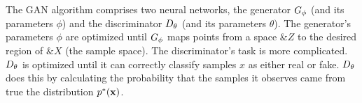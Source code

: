 The GAN algorithm comprises two neural networks, the generator $G_\phi$
(and its parameters $\phi$) and the discriminator $D_\theta$ (and its
parameters $\theta$). The generator's parameters $\phi$ are optimized
until $G_\phi$ maps points from a space $\&Z$ to the desired region of
$\&X$ (the sample space). The discriminator's task is more
complicated. $D_\theta$ is optimized until it can correctly classify samples
$x$ as either real or fake. $D_\theta$ does this by calculating the
probability that the samples it observes came from true the
distribution $p^*(\mathbf{x})$.


